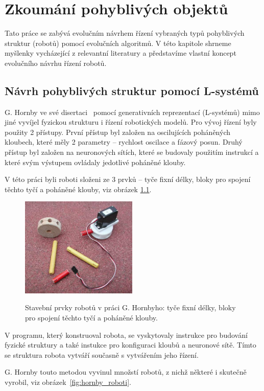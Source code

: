 \chapter{Zkoumání pohyblivých objektů}
Tato práce se zabývá evolučním návrhem řízení vybraných typů pohyblivých struktur (robotů) pomocí evolučních algoritmů.
V této kapitole shrneme myšlenky vycházející z relevantní literatury a představíme vlastní koncept evolučního návrhu řízení robotů.

\section{Návrh pohyblivých struktur pomocí L-systémů}
G. Hornby ve své disertaci~\cite{Hornby2003} pomocí generativních reprezentací (L-systémů) mimo jiné vyvíjel fyzickou strukturu i řízení robotických modelů.
Pro vývoj řízení byly použity 2 přístupy.
První přístup byl založen na oscilujících poháněných kloubech, které měly 2 parametry -- rychlost oscilace a fázový posun.
Druhý přístup byl založen na neuronových sítích, které se budovaly použitím instrukcí a které svým výstupem ovládaly jedotlivé poháněné klouby.

V této práci byli roboti složeni ze 3 prvků -- tyče fixní délky, bloky pro spojení těchto tyčí a poháněné klouby, viz obrázek \ref{fig:hornby_stavebni_prvky}.

\begin{figure}[h]
    \centering
    {\includegraphics[width=15em]{obrazky/hornby_stavebni_prvky.png}}
    \caption{
    Stavební prvky robotů v práci G. Hornbyho: tyče fixní délky, bloky pro spojení těchto tyčí a poháněné klouby.
    }
    \label{fig:hornby_stavebni_prvky}
\end{figure}

V programu, který konstruoval robota, se vyskytovaly instrukce pro budování fyzické struktury a také instukce pro konfiguraci kloubů a neuronové sítě.
Tímto se struktura robota vytváří současně s vytvářením jeho řízení.

G. Hornby touto metodou vyvinul množstí robotů, z nichž některé i skutečně vyrobil, viz obrázek~\ref{fig:hornby_roboti}.

